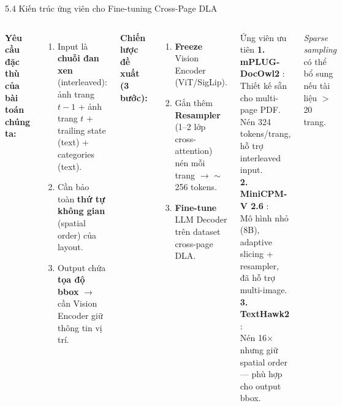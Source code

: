 \documentclass[aspectratio=1610,8pt]{beamer}
\begin{document}
\begin{frame}{5.4 \; Kiến trúc ứng viên cho Fine-tuning Cross-Page DLA}
    \begin{columns}[T]
        \textbf{Yêu cầu đặc thù của bài toán chúng ta:}
        \begin{enumerate}
            \item Input là \textbf{chuỗi đan xen} (interleaved): ảnh trang $t{-}1$ + ảnh trang $t$ + trailing state (text) + categories (text).
            \item Cần bảo toàn \textbf{thứ tự không gian} (spatial order) của layout.
            \item Output chứa \textbf{tọa độ bbox} $\rightarrow$ cần Vision Encoder giữ thông tin vị trí.
        \end{enumerate}

        \vspace{0.4em}
        \textbf{Chiến lược đề xuất (3 bước):}
        \begin{enumerate}
            \item \textbf{Freeze} Vision Encoder (ViT/SigLip).
            \item Gắn thêm \textbf{Resampler} (1--2 lớp cross-attention) nén mỗi trang $\rightarrow$ $\sim$256 tokens.
            \item \textbf{Fine-tune} LLM Decoder trên dataset cross-page DLA.
        \end{enumerate}

        \begin{exampleblock}{Ứng viên ưu tiên}
            {\small
            \textbf{1. mPLUG-DocOwl2} \cite{hu2024mplugdocowl2}:\\
            Thiết kế sẵn cho multi-page PDF. Nén 324 tokens/trang, hỗ trợ interleaved input.\\[0.3em]
            \textbf{2. MiniCPM-V 2.6} \cite{yao2024minicpmv}:\\
            Mô hình nhỏ (8B), adaptive slicing + resampler, đã hỗ trợ multi-image.\\[0.3em]
            \textbf{3. TextHawk2} \cite{yu2024texthawk2}:\\
            Nén 16$\times$ nhưng giữ spatial order — phù hợp cho output bbox.
            }
        \end{exampleblock}

        \vspace{0.2em}
        {\scriptsize \textit{Sparse sampling} \cite{feng2024pdfwukong} có thể bổ sung nếu tài liệu $>$20 trang.}
    \end{columns}
\end{frame}
\end{document}
